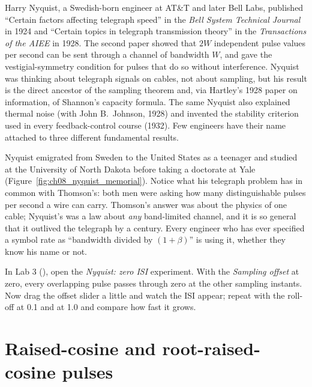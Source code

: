 \begin{history}[Nyquist, 1928]
Harry Nyquist, a Swedish-born engineer at AT\&T and later Bell Labs, published ``Certain
factors affecting telegraph speed'' in the \emph{Bell System Technical Journal} in 1924 and
``Certain topics in telegraph transmission theory'' in the \emph{Transactions of the AIEE} in
1928. The second paper showed that $2W$ independent pulse values per second can be sent through
a channel of bandwidth $W$, and gave the vestigial-symmetry condition for pulses that do so
without interference. Nyquist was thinking about telegraph signals on cables, not about
sampling, but his result is the direct ancestor of the sampling theorem and, via Hartley's
1928 paper on information, of Shannon's capacity formula. The same Nyquist also explained
thermal noise (with John B.~Johnson, 1928) and invented the stability criterion used in every
feedback-control course (1932). Few engineers have their name attached to three different
fundamental results.
\end{history}

Nyquist emigrated from Sweden to the United States as a teenager and
studied at the University of North Dakota before taking a doctorate at Yale
(Figure~\ref{fig:ch08_nyquist_memorial}). Notice what his telegraph problem has in common with
Thomson's: both men were asking how many distinguishable pulses per second a wire can carry.
Thomson's answer was about the physics of one cable; Nyquist's was a law about \emph{any}
band-limited channel, and it is so general that it outlived the telegraph by a century. Every
engineer who has ever specified a symbol rate as ``bandwidth divided by $(1+\beta)$'' is using
it, whether they know his name or not.

\begin{tryit}
In Lab 3 (), open the \emph{Nyquist: zero ISI} experiment. With the
\emph{Sampling offset} at zero, every overlapping pulse passes through zero at the other sampling
instants. Now drag the offset slider a little and watch the ISI appear; repeat with the
roll-off at 0.1 and at 1.0 and compare how fast it grows.
\end{tryit}

\section{Raised-cosine and root-raised-cosine pulses}
\label{sec:ch08:rc}

